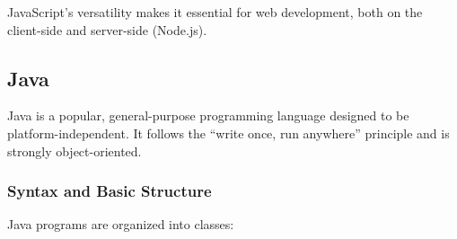 \begin{Shaded}
\begin{Highlighting}[]
 \NormalTok{() \{}
      \OperatorTok{,}\KeywordTok{=\textgreater{}}\NormalTok{ \{}
        \NormalTok{(() }\KeywordTok{=\textgreater{}} \NormalTok{(}\NormalTok{)}\OperatorTok{,} \NormalTok{)}\OperatorTok{;}
\NormalTok{    \})}\OperatorTok{;}
\NormalTok{\}}

  \NormalTok{() \{}
    \NormalTok{ \{}
        \OperatorTok{=}  \NormalTok{()}\OperatorTok{;}
        \OperatorTok{;}
\NormalTok{    \} }
        \OperatorTok{;}
\NormalTok{    \}}
\NormalTok{\}}

\NormalTok{()}\OperatorTok{;}
\end{Highlighting}
\end{Shaded}

JavaScript's versatility makes it essential for web development, both on
the client-side and server-side (Node.js).

\hypertarget{java}{%
\subsection{Java}\label{java}}

Java is a popular, general-purpose programming language designed to be
platform-independent. It follows the ``write once, run anywhere''
principle and is strongly object-oriented.

\hypertarget{syntax-and-basic-structure-3}{%
\subsubsection{Syntax and Basic
Structure}\label{syntax-and-basic-structure-3}}

Java programs are organized into classes:

\begin{Shaded}
\begin{Highlighting}[]
 
       \NormalTok{(}
        \NormalTok{(}\NormalTok{);}
\NormalTok{    \}}
\NormalTok{\}}
\end{Highlighting}
\end{Shaded}

